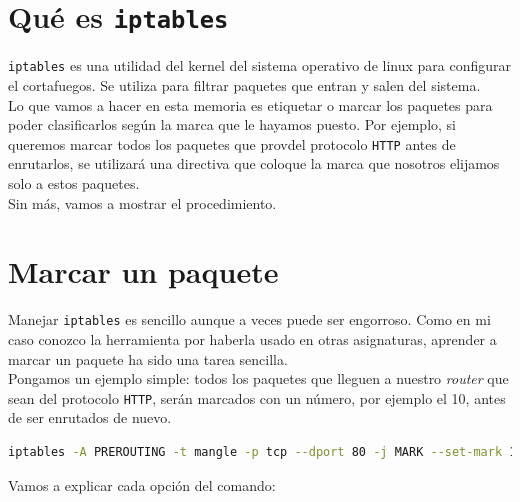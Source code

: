 \documentclass[11pt,a4paper]{article}
\begin{document}
\newpage

\section{Qué es \texttt{iptables}}

\texttt{iptables} es una utilidad del kernel del sistema operativo de linux para configurar el cortafuegos. Se utiliza para filtrar paquetes que entran y salen del sistema.\\

Lo que vamos a hacer en esta memoria es etiquetar o marcar los paquetes para poder clasificarlos según la marca que le hayamos puesto. Por ejemplo, si queremos marcar todos los paquetes que provdel protocolo \texttt{HTTP} antes de enrutarlos, se utilizará una directiva que coloque la marca que nosotros elijamos solo a estos paquetes.\\

Sin más, vamos a mostrar el procedimiento.

\section{Marcar un paquete}

Manejar \texttt{iptables} es sencillo aunque a veces puede ser engorroso. Como en mi caso conozco la herramienta por haberla usado en otras asignaturas, aprender a marcar un paquete ha sido una tarea sencilla.\\

Pongamos un ejemplo simple: todos los paquetes que lleguen a nuestro \textit{router} que sean del protocolo \texttt{HTTP}, serán marcados con un número, por ejemplo el 10, antes de ser enrutados de nuevo.\\

\begin{lstlisting}[language=bash,caption={Comando iptables},captionpos=b]
iptables -A PREROUTING -t mangle -p tcp --dport 80 -j MARK --set-mark 10
\end{lstlisting}

Vamos a explicar cada opción del comando:
\end{document}
